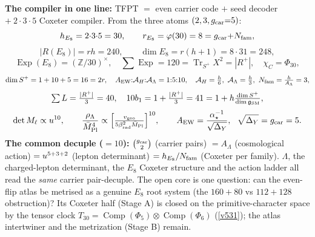 \par\medskip\noindent\textbf{The compiler in one line:} TFPT $=$ even carrier code $+$ seed decoder
$+\ 2{\cdot}3{\cdot}5$ Coxeter compiler. From the three atoms $(2,3,g_{\mathrm{car}}{=}5)$:
\[
  h_{E_8}=2{\cdot}3{\cdot}5=30,\qquad r_{E_8}=\varphi(30)=8=g_{\mathrm{car}}{+}N_{\mathrm{fam}},
\]
\[
  |R(E_8)|=rh=240,\qquad \dim E_8=r(h{+}1)=8{\cdot}31=248,
\]
\[
  \operatorname{Exp}(E_8)=(\mathbb Z/30)^\times,\quad \textstyle\sum\operatorname{Exp}=120=\operatorname{Tr}_{S^+}X^2=|R^+|,\quad
  \chi_C=\Phi_{30},
\]
\[
  \dim S^+=1+10+5=16=2r,\quad
  A_{\mathrm{EW}}{:}\mathcal A_H{:}\mathcal A_\Lambda=1{:}5{:}10,\quad
  \mathcal A_H=\tfrac h6,\ \mathcal A_\Lambda=\tfrac h3,\ N_{\mathrm{fam}}=\tfrac h{A_\Lambda}=3,
\]
\[
  \textstyle\sum L=\tfrac{|R^+|}{3}=40,\quad
  10b_1=1+\tfrac{|R^+|}{3}=41=1+h\tfrac{\dim S^+}{\dim\mathfrak g_{\mathrm{SM}}},
\]
\[
  \det M_\ell\propto\useed^{10},\qquad
  \frac{\rho_\Lambda}{\Mbar^4}\propto\Bigl[\tfrac{v_{\mathrm{geo}}}{5\betarad^2\Mbar}\Bigr]^{10},\qquad
  A_{\mathrm{EW}}=\frac{\ainv}{\sqrt{\Delta_Y}},\ \ \sqrt{\Delta_Y}=\gcar=5 .
\]
\textbf{The common decuple ($=10$):} $\binom{g_{\mathrm{car}}}{2}$ (carrier pairs) $=A_\Lambda$ (cosmological
action) $=u^{5+3+2}$ (lepton determinant) $=h_{E_8}/N_{\mathrm{fam}}$ (Coxeter per family). $\Lambda$, the
charged-lepton determinant, the $E_8$ Coxeter structure and the action ladder all read the \emph{same}
carrier pair-decuple. The open core is one question: can the even-flip atlas be metrised as a genuine
$E_8$ root system (the $160{+}80$ vs $112{+}128$ obstruction)? Its Coxeter half (Stage A) is closed on
the primitive-character space by the tensor clock $T_{30}=\operatorname{Comp}(\Phi_5)\otimes
\operatorname{Comp}(\Phi_6)$ (\vref{v531}); the atlas intertwiner and the metrization (Stage B) remain.

\clearpage
